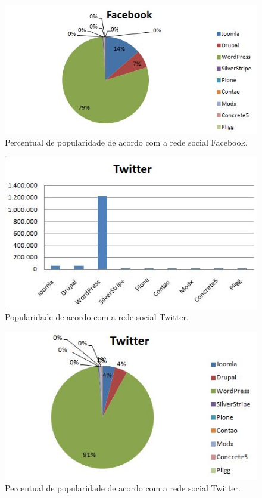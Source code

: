 \begin{figure}[!ht]
\centering
\includegraphics[keepaspectratio=true,scale = 0.9]{figuras/facebook1.JPG}
\caption{Percentual de popularidade de acordo com a rede social Facebook.}
\label{pop_004}
\end{figure}

\begin{figure}[!ht]
\centering
\includegraphics[keepaspectratio=true,scale = 0.9]{figuras/Twitter.JPG}
\caption{Popularidade de acordo com a rede social Twitter.}
\label{pop_005}
\end{figure}

\begin{figure}[!ht]
\centering
\includegraphics[keepaspectratio=true,scale = 0.8]{figuras/Twitter1.JPG}
\caption{Percentual de popularidade de acordo com a rede social Twitter.}
\label{pop_006}
\end{figure}

